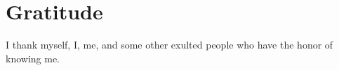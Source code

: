 \section*{Gratitude}

I thank myself, I, me, and some other exulted people who have the honor of knowing me.
